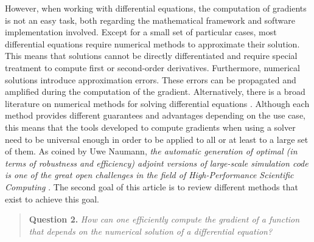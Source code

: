 However, when working with differential equations, the computation of gradients is not an easy task, both regarding the mathematical framework and software implementation involved. 
Except for a small set of particular cases, most differential equations require numerical methods to approximate their solution.
This means that solutions cannot be directly differentiated and require special treatment to compute first or second-order derivatives. 
Furthermore, numerical solutions introduce approximation errors. 
These errors can be propagated and amplified during the computation of the gradient. 
Alternatively, there is a broad literature on numerical methods for solving differential equations \cite{hairer-solving-1, hairer-solving-2}. 
Although each method provides different guarantees and advantages depending on the use case, this means that the tools developed to compute gradients when using a solver need to be universal enough in order to be applied to all or at least to a large set of them. 
As coined by Uwe Naumann, \textit{the automatic generation of optimal (in terms of robustness and efficiency) adjoint versions of large-scale simulation code is one of the great open challenges in the field of High-Performance Scientific Computing} \cite{Naumann.2011}.
The second goal of this article is to review different methods that exist to achieve this goal.
\begin{quote}
    \textbf{Question 2. }
    \textit{How can one efficiently compute the gradient of a function that depends on the numerical solution of a differential equation?}
\end{quote}

